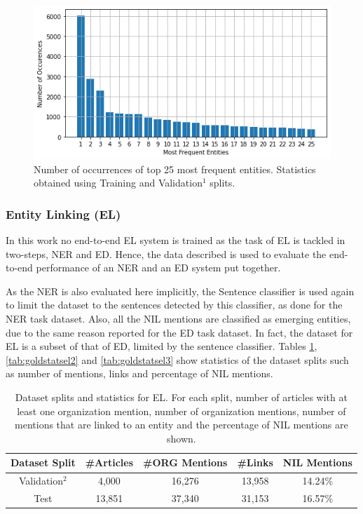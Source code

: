 \documentclass{report}
\theoremstyle{definition}
\theoremstyle{remark}
\begin{document}
\begin{figure}[H]
    \centering
    \includegraphics[scale=0.6]{ent_occ.png}
    \caption{Number of occurrences of top 25 most frequent entities. Statistics obtained using Training and Validation$^1$ splits.}
    \label{fig:entpopul}
\end{figure}


\subsubsection{Entity Linking (EL)}
In this work no end-to-end EL system is trained as the task of EL is tackled in two-steps, NER and ED. Hence, the data described is used to evaluate the end-to-end performance of an NER and an ED system put together. 

As the NER is also evaluated here implicitly, the Sentence classifier is used again to limit the dataset to the sentences detected by this classifier, as done for the NER task dataset. Also, all the NIL mentions are classified as emerging entities, due to the same reason reported for the ED task dataset. In fact, the dataset for EL is a subset of that of ED, limited by the sentence classifier. Tables \ref{tab:goldstatsel}, \ref{tab:goldstatsel2} and \ref{tab:goldstatsel3} show statistics of the dataset splits such as number of mentions, links and percentage of NIL mentions.

\begin{table}[H]
    \centering
    \begin{tabular}{ccccc}
     Dataset Split & \#Articles & \#ORG Mentions & \#Links & NIL Mentions  \\
     \hline
    Validation$^2$ & 4,000  & 16,276 & 13,958 & 14.24\% \\
    Test           & 13,851 & 37,340 & 31,153 & 16.57\% \\
    \end{tabular}
    \caption{Dataset splits and statistics for EL. For each split, number of articles with at least one organization mention, number of organization mentions, number of mentions that are linked to an entity and the percentage of NIL mentions are shown.}
    \label{tab:goldstatsel}
\end{table}
\end{document}
